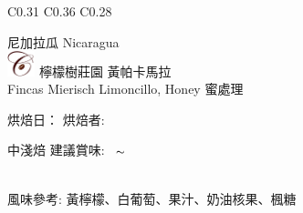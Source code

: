 \documentclass[10pt,a4paper]{article}
\begin{document}
\begin{tabular}{C{0.31\textwidth} C{0.36\textwidth} C{0.28\textwidth}}
{\hspace*{1.3cm} { \vspace*{-0.68cm}\Large 
尼加拉瓜  %
\large
Nicaragua%
}\\
{ \hspace*{-0.66cm}\includegraphics[trim=0 20em 0 -20em,width=0.06\textwidth]{NEWC.png}%
\Large \hspace*{0.1em} \vspace*{0.15cm}  
\hspace*{-0.5em}檸檬樹莊園 \large 黃帕卡馬拉%
}\vspace*{0.15em}\\
{\small
Fincas Mierisch Limoncillo, Honey 蜜處理 %
}\vspace*{0.35em}\\
\setdatetoday \addtocounter{datenumber}{
-1%
}\setdatebynumber{\thedatenumber}
{\scriptsize 烘焙日：{\scriptsize\datedate}\hspace{0.3em}%
烘焙者: \textbf{\scriptsize{}}}\vspace*{-0.3em}\\
 \addtocounter{datenumber}{
5 }%
\setdatebynumber{\thedatenumber} 
{\normalsize 
中淺焙%
\enskip \scriptsize 建議賞味:} \scriptsize{\datemonthname ~\thedateday}$\thicksim$\addtocounter{datenumber}{55}\setdatebynumber{\thedatenumber} \datedate
\\\scriptsize 風味參考: 黃檸檬、白葡萄、果汁、奶油核果、楓糖
}
\end{tabular}
\end{document}
